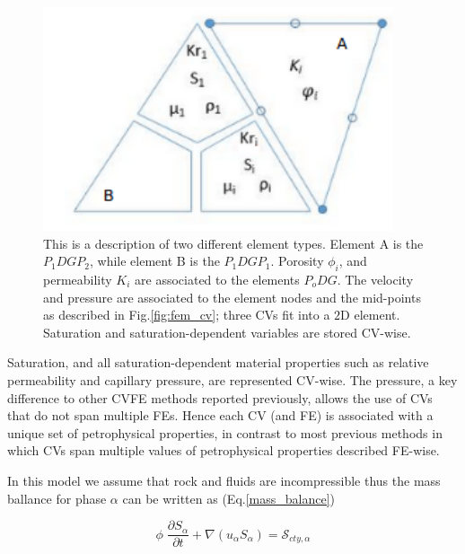 \documentclass[preprint,authoryear,12pt]{elsarticle}
\begin{document}
\begin{figure}[h] 
\centering
\includegraphics[width=.5\textwidth]{./Pics/element_n.pdf}
\caption{This is a description of two different element types. Element A is the $P_{1}DGP_{2}$, while element B is the $P_{1}DGP_{1}$. Porosity $\phi_{i}$, and permeability $K_{i}$ are associated to the elements $P_{o}DG$. The velocity and pressure are associated to the element nodes and the mid-points as described in Fig.\ref{fig:fem_cv}; three CVs fit into a $2$D element. Saturation and saturation-dependent variables are stored CV-wise. }
\label{fig:fem_elem}
\end{figure}

Saturation, and all saturation-dependent material properties such as relative permeability and capillary pressure, are represented CV-wise. The pressure, a key difference to other CVFE methods reported previously, allows the use of CVs that do not span multiple FEs. Hence each CV (and FE) is associated with a unique set of petrophysical properties, in contrast to most previous methods in which CVs span multiple values of petrophysical properties described FE-wise.

In this model we assume that rock and fluids are incompressible thus the mass ballance for phase $\alpha$ can be written as (Eq.\ref{mass_balance})

\begin{equation}
\phi \; \frac{\partial S_{\alpha}}{\partial t} + \nabla (u_{\alpha}S_{\alpha})= \mathcal{S}_{cty,\alpha}
\label{mass_balance}
\end{equation}
 

\end{document}
